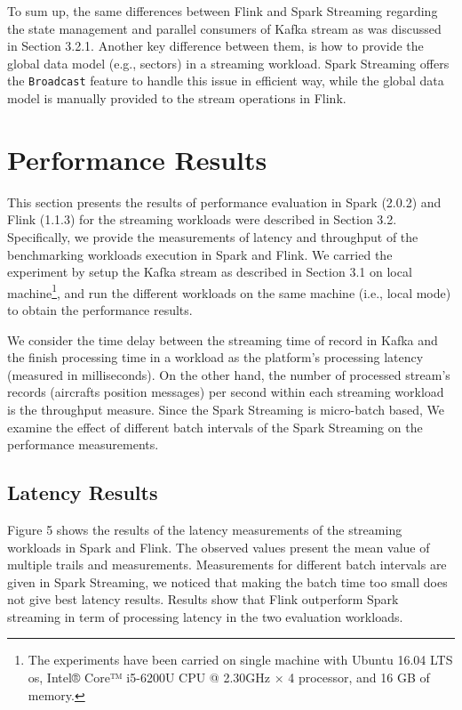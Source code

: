 \documentclass[]{article}
\begin{document}
 
 \par To sum up, the same differences between Flink and Spark Streaming regarding the state management and parallel  consumers of Kafka stream as was discussed in Section 3.2.1. Another key difference between them, is how  to provide the global data model (e.g., sectors) in a streaming workload. Spark Streaming offers the \texttt{Broadcast} feature to handle this issue in efficient way, while the global data model is manually provided  to the stream operations in Flink.
\section{Performance Results}

\par This section presents the results of performance evaluation in Spark (2.0.2) and Flink (1.1.3) for the streaming workloads were described in Section 3.2. Specifically, we provide  the measurements of latency and throughput of the benchmarking workloads execution in Spark and Flink. We carried the experiment by setup the Kafka stream as described in Section 3.1 on local machine\footnote{ The experiments have been carried  on single machine with Ubuntu 16.04 LTS os, Intel® Core™ i5-6200U CPU @ 2.30GHz × 4  processor, and 16 GB of memory.  }, and run the different workloads on the same machine (i.e., local mode) to obtain the performance results.  

\par We consider the time delay between the streaming time of record in Kafka and the 
finish processing time in a workload as the platform's processing latency (measured in milliseconds). On the other hand, the number of processed stream's records (aircrafts position messages) per second within each streaming workload is the throughput measure. Since the Spark Streaming is micro-batch based,  We examine the effect of different batch intervals
of the Spark Streaming on the performance measurements.
\subsection{Latency Results}

Figure 5 shows the results of the latency measurements of the streaming workloads in Spark and Flink. The observed values present the mean value of multiple trails and measurements. Measurements for different batch intervals are given in Spark Streaming, we noticed that making the batch time too small does not give best latency results. Results show that Flink outperform Spark streaming in term of processing latency in the two evaluation workloads.
\end{document}
